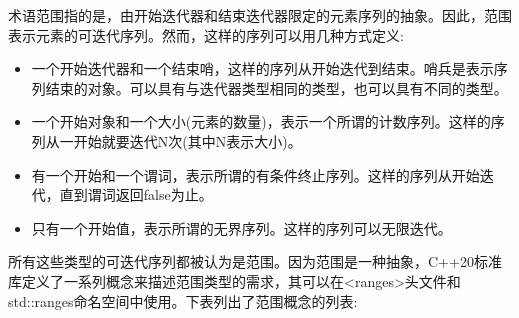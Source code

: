 
术语范围指的是，由开始迭代器和结束迭代器限定的元素序列的抽象。因此，范围表示元素的可迭代序列。然而，这样的序列可以用几种方式定义:

\begin{itemize}
\item
一个开始迭代器和一个结束哨，这样的序列从开始迭代到结束。哨兵是表示序列结束的对象。可以具有与迭代器类型相同的类型，也可以具有不同的类型。

\item
一个开始对象和一个大小(元素的数量)，表示一个所谓的计数序列。这样的序列从一开始就要迭代N次(其中N表示大小)。

\item
有一个开始和一个谓词，表示所谓的有条件终止序列。这样的序列从开始迭代，直到谓词返回false为止。

\item
只有一个开始值，表示所谓的无界序列。这样的序列可以无限迭代。
\end{itemize}

所有这些类型的可迭代序列都被认为是范围。因为范围是一种抽象，C++20标准库定义了一系列概念来描述范围类型的需求，其可以在<ranges>头文件和std::ranges命名空间中使用。下表列出了范围概念的列表:

